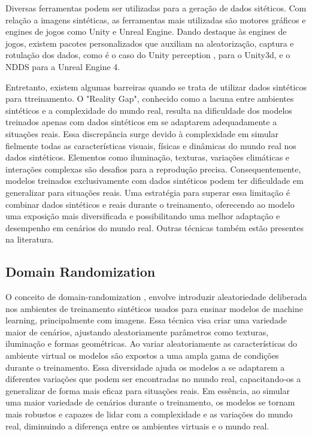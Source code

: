 Diversas ferramentas podem ser utilizadas para a geração de dados sitéticos. Com relação a imagens sintéticas, as ferramentas mais utilizadas são motores gráficos e engines de jogos como Unity e Unreal Engine. Dando destaque às engines de jogos, existem pacotes personalizados que auxiliam na aleatorização, captura e rotulação dos dados, como é o caso do Unity perception \cite{unity-perception}, para o Unity3d, e o NDDS\cite{NDDS} para a Unreal Engine 4.

Entretanto, existem algumas barreiras quando se trata de utilizar dados sintéticos para ttreinamento. O "Reality Gap", conhecido como a lacuna entre ambientes sintéticos e a complexidade do mundo real, resulta na dificuldade dos modelos treinados apenas com dados sintéticos em se adaptarem adequadamente a situações reais. Essa discrepância surge devido à complexidade em simular fielmente todas as características visuais, físicas e dinâmicas do mundo real nos dados sintéticos. Elementos como iluminação, texturas, variações climáticas e interações complexas são desafios para a reprodução precisa. Consequentemente, modelos treinados exclusivamente com dados sintéticos podem ter dificuldade em generalizar para situações reais. Uma estratégia para superar essa limitação é combinar dados sintéticos e reais durante o treinamento, oferecendo ao modelo uma exposição mais diversificada e possibilitando uma melhor adaptação e desempenho em cenários do mundo real. Outras técnicas também estão presentes na literatura.

\subsection{Domain Randomization}

O conceito de domain-randomization \cite{domain-random}, envolve introduzir aleatoriedade deliberada nos ambientes de treinamento sintéticos usados para ensinar modelos de machine learning, principalmente com imagens. Essa técnica visa criar uma variedade maior de cenários, ajustando aleatoriamente parâmetros como texturas, iluminação e formas geométricas. Ao variar aleatoriamente as características do ambiente virtual os modelos são expostos a uma ampla gama de condições durante o treinamento. Essa diversidade ajuda os modelos a se adaptarem a diferentes variações que podem ser encontradas no mundo real, capacitando-os a generalizar de forma mais eficaz para situações reais. Em essência, ao simular uma maior variedade de cenários durante o treinamento, os modelos se tornam mais robustos e capazes de lidar com a complexidade e as variações do mundo real, diminuindo a diferença entre os ambientes virtuais e o mundo real.

